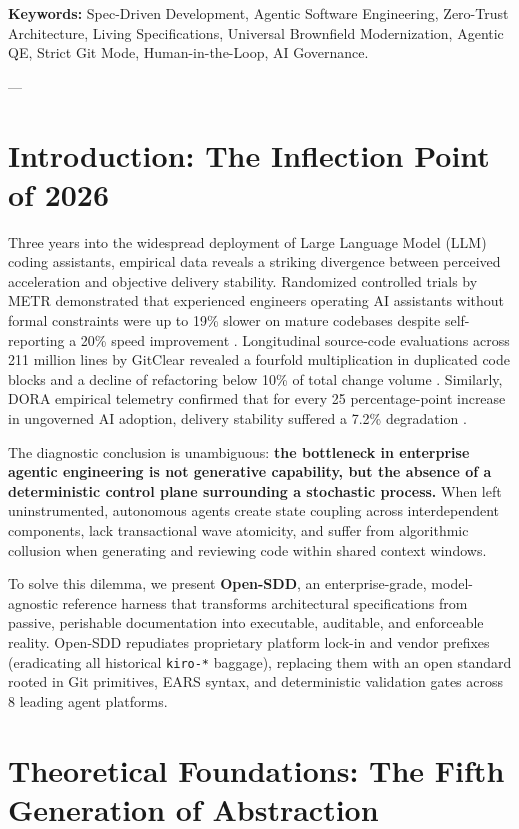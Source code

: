\documentclass[11pt,a4paper]{article}
\begin{document}
\noindent\textbf{Keywords:} Spec-Driven Development, Agentic Software Engineering, Zero-Trust Architecture, Living Specifications, Universal Brownfield Modernization, Agentic QE, Strict Git Mode, Human-in-the-Loop, AI Governance.

---

\section{Introduction: The Inflection Point of 2026}

Three years into the widespread deployment of Large Language Model (LLM) coding assistants, empirical data reveals a striking divergence between perceived acceleration and objective delivery stability. Randomized controlled trials by METR demonstrated that experienced engineers operating AI assistants without formal constraints were up to 19\% slower on mature codebases despite self-reporting a 20\% speed improvement \cite{metr2025}. Longitudinal source-code evaluations across 211 million lines by GitClear revealed a fourfold multiplication in duplicated code blocks and a decline of refactoring below 10\% of total change volume \cite{gitclear2025}. Similarly, DORA empirical telemetry confirmed that for every 25 percentage-point increase in ungoverned AI adoption, delivery stability suffered a 7.2\% degradation \cite{dora2024}.

The diagnostic conclusion is unambiguous: \textbf{the bottleneck in enterprise agentic engineering is not generative capability, but the absence of a deterministic control plane surrounding a stochastic process.} When left uninstrumented, autonomous agents create state coupling across interdependent components, lack transactional wave atomicity, and suffer from algorithmic collusion when generating and reviewing code within shared context windows.

To solve this dilemma, we present \textbf{Open-SDD}, an enterprise-grade, model-agnostic reference harness that transforms architectural specifications from passive, perishable documentation into executable, auditable, and enforceable reality. Open-SDD repudiates proprietary platform lock-in and vendor prefixes (eradicating all historical \texttt{kiro-*} baggage), replacing them with an open standard rooted in Git primitives, EARS syntax, and deterministic validation gates across 8 leading agent platforms.

\section{Theoretical Foundations: The Fifth Generation of Abstraction}
\end{document}
